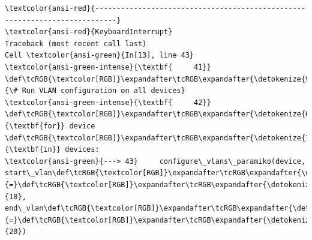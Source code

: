 \documentclass[11pt]{article}
\begin{document}
    \begin{Verbatim}[commandchars=\\\{\}, frame=single, framerule=2mm, rulecolor=\color{outerrorbackground}]
\textcolor{ansi-red}{---------------------------------------------------------------------------}
\textcolor{ansi-red}{KeyboardInterrupt}                         Traceback (most recent call last)
Cell \textcolor{ansi-green}{In[13], line 43}
\textcolor{ansi-green-intense}{\textbf{     41}} \def\tcRGB{\textcolor[RGB]}\expandafter\tcRGB\expandafter{\detokenize{95,135,135}}{\# Run VLAN configuration on all devices}
\textcolor{ansi-green-intense}{\textbf{     42}} \def\tcRGB{\textcolor[RGB]}\expandafter\tcRGB\expandafter{\detokenize{0,135,0}}{\textbf{for}} device \def\tcRGB{\textcolor[RGB]}\expandafter\tcRGB\expandafter{\detokenize{175,0,255}}{\textbf{in}} devices:
\textcolor{ansi-green}{---> 43}     configure\_vlans\_paramiko(device, start\_vlan\def\tcRGB{\textcolor[RGB]}\expandafter\tcRGB\expandafter{\detokenize{98,98,98}}{=}\def\tcRGB{\textcolor[RGB]}\expandafter\tcRGB\expandafter{\detokenize{98,98,98}}{10}, end\_vlan\def\tcRGB{\textcolor[RGB]}\expandafter\tcRGB\expandafter{\detokenize{98,98,98}}{=}\def\tcRGB{\textcolor[RGB]}\expandafter\tcRGB\expandafter{\detokenize{98,98,98}}{20})


\end{Verbatim}
\end{document}
